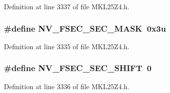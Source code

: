 Definition at line 3337 of file M\+K\+L25\+Z4.\+h.

\subsubsection[{\texorpdfstring{N\+V\+\_\+\+F\+S\+E\+C\+\_\+\+S\+E\+C\+\_\+\+M\+A\+SK}{NV_FSEC_SEC_MASK}}]{\setlength{\rightskip}{0pt plus 5cm}\#define N\+V\+\_\+\+F\+S\+E\+C\+\_\+\+S\+E\+C\+\_\+\+M\+A\+SK~0x3u}\hypertarget{group___n_v___register___masks_gab159c721c6cde1f629b630c573da8ea9}{}\label{group___n_v___register___masks_gab159c721c6cde1f629b630c573da8ea9}


Definition at line 3335 of file M\+K\+L25\+Z4.\+h.

\subsubsection[{\texorpdfstring{N\+V\+\_\+\+F\+S\+E\+C\+\_\+\+S\+E\+C\+\_\+\+S\+H\+I\+FT}{NV_FSEC_SEC_SHIFT}}]{\setlength{\rightskip}{0pt plus 5cm}\#define N\+V\+\_\+\+F\+S\+E\+C\+\_\+\+S\+E\+C\+\_\+\+S\+H\+I\+FT~0}\hypertarget{group___n_v___register___masks_ga92a819b24b0472a83857ddd2d950ab08}{}\label{group___n_v___register___masks_ga92a819b24b0472a83857ddd2d950ab08}


Definition at line 3336 of file M\+K\+L25\+Z4.\+h.

